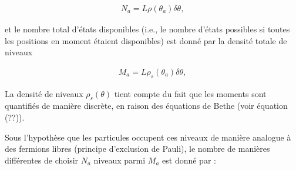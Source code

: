 \begin{eqnarray*}
	N_a = L\rho(\theta_a) \delta \theta,
\end{eqnarray*}

et le nombre total d'états disponibles (i.e., le nombre d’états possibles si toutes les positions en moment étaient disponibles) est donné par la densité totale de niveaux 

\begin{eqnarray*}
	M_a = L\rho_s(\theta_a) \delta \theta,
\end{eqnarray*}

La densité de niveaux $\rho_s(\theta)$ tient compte du fait que les moments sont quantifiés de manière discrète, en raison des équations de Bethe (voir équation (??)).

Sous l'hypothèse que les particules occupent ces niveaux de manière analogue à des fermions libres (principe d’exclusion de Pauli), le nombre de manières différentes de choisir $N_a$ niveaux parmi $M_a$ est donné par :
	
	
	
	\begin{figure}[H]
		\centering 
		\captionsetup{skip=10pt} %
	\end{figure}
	
